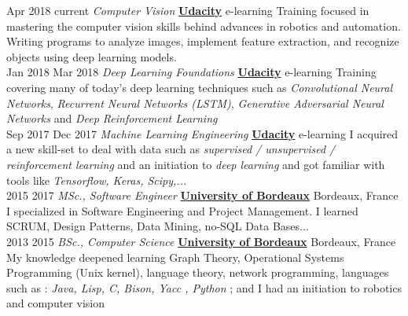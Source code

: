 \documentclass[letterpaper]{twentysecondcv} %
\begin{document}
\begin{twenty} %

  \twentyitem
      {Apr 2018}
      {current}
        { \textit{Computer Vision}}
        {\href{http://www.udacity.com/}{\textbf{Udacity}}}
        {e-learning}
        {Training focused in mastering the computer vision skills behind advances in robotics
          and automation. Writing programs to analyze images, implement feature
          extraction,
          and recognize objects using deep learning models.}
    \\
  \twentyitem
      {Jan 2018}
      {Mar 2018}
        { \textit{Deep Learning Foundations}}
        {\href{http://www.udacity.com/}{\textbf{Udacity}}}
        {e-learning}
        {Training covering many of today's deep learning techniques such as
          \textit{Convolutional Neural Networks}, \textit{Recurrent Neural Networks (LSTM)},
          \textit{Generative Adversarial Neural Networks} and \textit{Deep Reinforcement Learning}}
    \\
  \twentyitem
      {Sep 2017}
      {Dec 2017}
        { \textit{Machine Learning Engineering}}
        {\href{http://www.udacity.com/}{\textbf{Udacity}}}
        {e-learning}
        {I acquired a new skill-set to deal with data such as \textit{supervised /
            unsupervised / reinforcement learning} and an initiation to \textit{deep learning}
          and got familiar with tools like \textit{Tensorflow, Keras, Scipy,...}}
    \\
  \twentyitem
      {2015}
      {2017}
        { \textit{MSc., Software Engineer}}
        {\href{http://www.u-bordeaux.com/}{\textbf{University of Bordeaux}}}
        {Bordeaux, France}
        {I specialized in Software Engineering and Project Management. I learned SCRUM, Design Patterns, Data Mining, no-SQL
Data Bases...}
    \\
  \twentyitem
  {2013}
  {2015}
        { \textit{BSc., Computer Science}}
        {\href{http://www.u-bordeaux.com/}{\textbf{University of Bordeaux}}}
        {Bordeaux, France}
        {My knowledge deepened learning Graph Theory, Operational Systems
          Programming (Unix kernel), language theory, network programming,
          languages such as : \textit{Java, Lisp, C, Bison, Yacc , Python }; and I had an
          initiation to robotics and computer vision}
    \\

\end{twenty}
\end{document}
